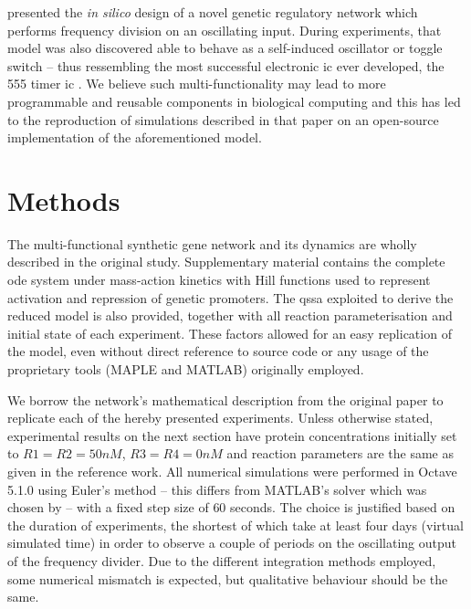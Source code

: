   \citet{multif} presented the \textit{in silico} design of a novel genetic regulatory network which performs frequency division on an oscillating input.
  During experiments, that model was also discovered able to behave as a self-induced oscillator or toggle switch -- thus ressembling the most successful electronic \ac{ic} ever developed, the 555 timer \acs{ic} \cite{ic555}.
  We believe such multi-functionality may lead to more programmable and reusable components in biological computing and this has led to the reproduction of simulations described in that paper on an open-source implementation of the aforementioned model.


\section{Methods}


  The multi-functional synthetic gene network and its dynamics are wholly described in the original study.
  Supplementary material contains the complete \ac{ode} system under mass-action kinetics with Hill functions used to represent activation and repression of genetic promoters.
  The \ac{qssa} exploited to derive the reduced model is also provided, together with all reaction parameterisation and initial state of each experiment.
  These factors allowed for an easy replication of the model, even without direct reference to source code or any usage of the proprietary tools (MAPLE and MATLAB) originally employed.

  We borrow the network's mathematical description from the original paper to replicate each of the hereby presented experiments.
  Unless otherwise stated, experimental results on the next section have protein concentrations initially set to $R1 = R2 = 50nM$, $R3 = R4 = 0nM$ and reaction parameters are the same as given in the reference work.
  All numerical simulations were performed in Octave 5.1.0 using Euler's method -- this differs from MATLAB's  solver which was chosen by \citet{multif} -- with a fixed step size of $60$ seconds.
  The choice is justified based on the duration of experiments, the shortest of which take at least four days (virtual simulated time) in order to observe a couple of periods on the oscillating output of the frequency divider.
  Due to the different integration methods employed, some numerical mismatch is expected, but qualitative behaviour should be the same.

